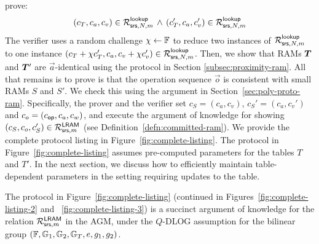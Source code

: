 prove:
\begin{equation}
(c_T, c_a, c_v)\in \mathcal{R}^{\mathsf{lookup}}_{\mathsf{srs},N,m}\, \wedge\, (c_T', c_a, c_v')\in \mathcal{R}^{\mathsf{lookup}}_{\mathsf{srs},N,m}
\end{equation}
The verifier uses a random challenge $\chi\gets \mathbb{F}$ to reduce two instances of $\mathcal{R}^{\mathsf{lookup}}_{\mathsf{srs},N,m}$ to one instance
$(c_T + \chi c_T', c_a, c_v + \chi c_v')\in \mathcal{R}^{\mathsf{lookup}}_{\mathsf{srs},N,m}$. Then, we show that
RAMs $\vecT$ and $\vecT'$ are $\vec{a}$-identical using the protocol in Section \ref{subsec:proximity-ram}.
All that remains is to prove is that the operation sequence $\vec{o}$ is consistent with small RAMs $S$ and $S'$.
We check this using the argument in Section~\ref{sec:poly-proto-ram}. Specifically, the prover and the verifier set
$c_S = (c_a, c_v)$, $c_S'=(c_a, c_v')$ and $c_o = (c_{\mathsf{op}}, c_a, c_w)$, and execute the argument of knowledge for
showing $(c_S, c_o, c_S')\in \mathcal{R}^{\mathsf{LRAM}}_{\mathsf{srs},m}$ (see Definition~\ref{defn:committed-ram}). We provide the complete protocol
listing in Figure~\ref{fig:complete-listing}. The protocol in Figure~\ref{fig:complete-listing} assumes pre-computed parameters
for the tables $T$ and $T'$. In the next section, we discuss how to efficiently maintain table-dependent parameters in the setting
requiring updates to the table.

\begin{theorem}\label{thm:committed-ram}
The protocol in Figure~\ref{fig:complete-listing} (continued in Figures~\ref{fig:complete-listing-2} and
~\ref{fig:complete-listing-3}) is a succinct argument of knowledge for the relation $\mathcal{R}^{\mathsf{LRAM}}_{\mathsf{srs},m}$ in
the AGM, under the $Q$-DLOG assumption for the bilinear group $(\mathbb{F},\mathbb{G}_1,\mathbb{G}_2,\mathbb{G}_T,e,g_1,g_2)$.
\end{theorem}

